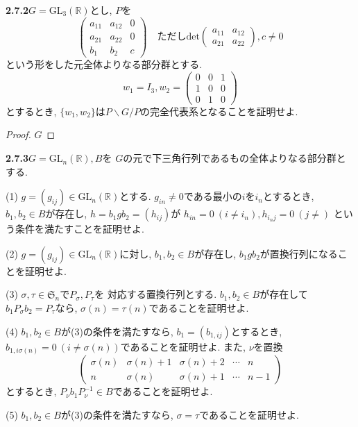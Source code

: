  
\textbf{2.7.2}\quad $G=\mathrm{GL}_3(\mathbb{R})$とし, $P$を
\[\begin{pmatrix}
	a_{11} & a_{12} & 0 \\
	a_{21} & a_{22} & 0 \\
	b_1 & b_2 & c
\end{pmatrix} \quad ただし\mathrm{det}\begin{pmatrix}
	a_{11} & a_{12} \\
	a_{21} & a_{22}
\end{pmatrix}, c\neq 0\]
という形をした元全体よりなる部分群とする.
\[ w_1=I_3, w_2=\begin{pmatrix}
	0&0&1 \\ 1&0&0 \\ 0&1&0
\end{pmatrix}\]とするとき, 
$\{w_1,w_2\}$は$P\backslash G/P$の完全代表系となることを証明せよ.\newline
\begin{proof}
  $G$
\end{proof}\leavevmode

\textbf{2.7.3}\quad $G=\mathrm{GL}_n(\mathbb{R}), B$を
$G$の元で下三角行列であるもの全体よりなる部分群とする.

(1) $g=(g_{ij}) \in \mathrm{GL}_n(\mathbb{R})$とする.
$g_{in}\neq 0$である最小の$i$を$i_n$とするとき,
$b_1, b_2 \in B$が存在し, $h=b_1 g b_2=(h_{ij})$が
$h_{in}=0\: (i \neq i_n),h_{{i_n}j}=0\: (j\neq)$
という条件を満たすことを証明せよ.

(2) $g=(g_{ij}) \in \mathrm{GL}_n(\mathbb{R})$に対し,
$b_1, b_2 \in B$が存在し, $b_1 g b_2$が置換行列になることを証明せよ.

(3) $\sigma, \tau \in \mathfrak{S}_n$で$P_\sigma, P_\tau$を
対応する置換行列とする.
$b_1, b_2 \in B$が存在して$b_1P_\sigma b_2=P_\tau$なら,
$\sigma(n)=\tau(n)$であることを証明せよ.

(4) $b_1, b_2 \in B$が(3)の条件を満たすなら, $b_1=(b_{1,ij})$とするとき,
$b_{1,i\sigma(n)}=0\: (i \neq \sigma(n))$であることを証明せよ.
また, $\nu$を置換
\[
\begin{pmatrix}
	\sigma(n) & \sigma(n)+1 & \sigma(n)+2 & \cdots & n \\
	n & \sigma(n) & \sigma(n)+1 & \cdots & n-1
\end{pmatrix}
\]
とするとき, $P_\nu b_1 P_\nu^{-1} \in B$であることを証明せよ.

(5) $b_1, b_2 \in B$が(3)の条件を満たすなら, 
$\sigma=\tau$であることを証明せよ.
